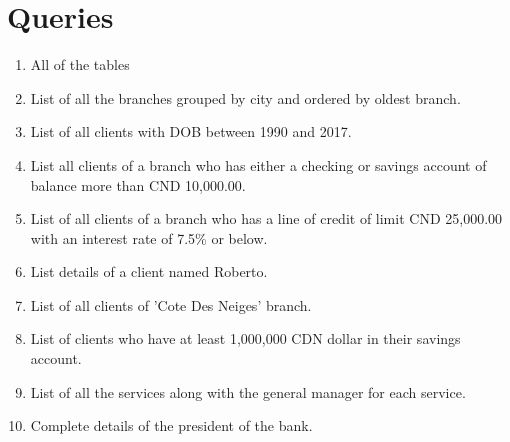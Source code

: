 \documentclass[letterpaper, 12pt]{article}
\begin{document}
\begin{figure}[ht]
  
\end{figure}

\section{Queries}

\begin{enumerate}[label=(\alph*)]
  \item All of the tables
  \item List of all the branches grouped by city and ordered by oldest branch.
  \item List of all clients with DOB between 1990 and 2017.
  \item List all clients of a branch who has either a checking or savings account of balance more than CND 10,000.00.
  \item List of all clients of a branch who has a line of credit of limit CND 25,000.00 with an interest rate of 7.5\% or below.
  \item List details of a client named Roberto.
  \item List of all clients of 'Cote Des Neiges' branch.
  \item List of clients who have at least 1,000,000 CDN dollar in their savings account.
  \item List of all the services along with the general manager for each service.
  \item Complete details of the president of the bank.
\end{enumerate}
\end{document}
